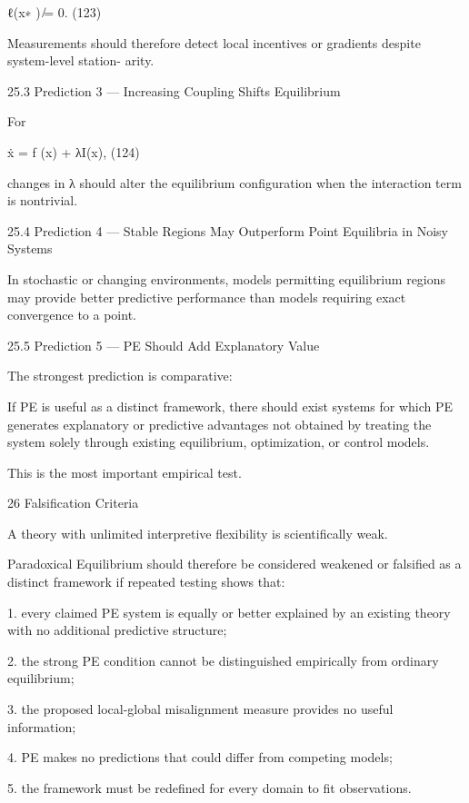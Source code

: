 \documentclass[10pt,a4paper]{article}
\begin{document}
\begin{ManuscriptText}
                                                ℓ(x∗ ) ̸= 0.                                  (123)

Measurements should therefore detect local incentives or gradients despite system-level station-
arity.


25.3       Prediction 3 — Increasing Coupling Shifts Equilibrium

For


                                            ẋ = f (x) + λI(x),                               (124)

changes in λ should alter the equilibrium configuration when the interaction term is nontrivial.


25.4       Prediction 4 — Stable Regions May Outperform Point Equilibria in
           Noisy Systems

In stochastic or changing environments, models permitting equilibrium regions may provide
better predictive performance than models requiring exact convergence to a point.


25.5       Prediction 5 — PE Should Add Explanatory Value

The strongest prediction is comparative:

         If PE is useful as a distinct framework, there should exist systems for which PE
         generates explanatory or predictive advantages not obtained by treating the system
         solely through existing equilibrium, optimization, or control models.

This is the most important empirical test.


26        Falsification Criteria

A theory with unlimited interpretive flexibility is scientifically weak.

Paradoxical Equilibrium should therefore be considered weakened or falsified as a distinct
framework if repeated testing shows that:

   1. every claimed PE system is equally or better explained by an existing theory with no
         additional predictive structure;


     2. the strong PE condition cannot be distinguished empirically from ordinary equilibrium;

     3. the proposed local-global misalignment measure provides no useful information;

     4. PE makes no predictions that could differ from competing models;

     5. the framework must be redefined for every domain to fit observations.



\end{ManuscriptText}
\end{document}
